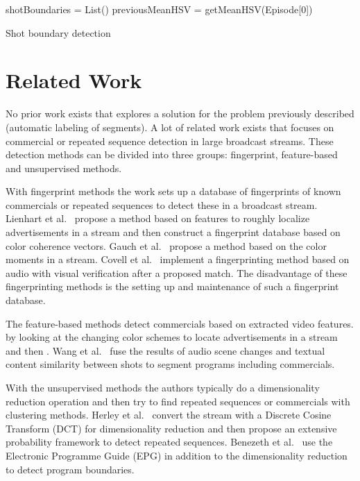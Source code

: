 \documentclass{article}
\begin{document}
\begin{algorithm}[h] \label{algorithm:shotboundary}
	\SetAlgoLined
	shotBoundaries = List()\;
	previousMeanHSV = getMeanHSV(Episode[0])\;
	\caption{Shot boundary detection}
\end{algorithm}

\section{Related Work} \label{relatedwork}

No prior work exists that explores a solution for the problem previously described (automatic labeling of segments).  A lot of related work exists that focuses on commercial or repeated sequence detection in large broadcast streams. These detection methods can be divided into three groups: fingerprint, feature-based and unsupervised methods. 

With fingerprint methods the work sets up a database of fingerprints of known commercials or repeated sequences to detect these in a broadcast stream. Lienhart et al.\ \cite{lienhart1997detection} propose a method based on features to roughly localize advertisements in a stream and then construct a fingerprint database based on color coherence vectors. Gauch et al.\ \cite{gauch2006finding} propose a method based on the color moments in a stream. Covell et al.\ \cite{covell2006advertisement} implement a fingerprinting method based on audio with visual verification after a proposed match. The disadvantage of these fingerprinting methods is the setting up and maintenance of such a fingerprint database. 


The feature-based methods detect commercials based on extracted video features.  by looking at the changing color schemes to locate advertisements in a stream and then . Wang et al.\ \cite{wang2008multimodal} fuse the results of audio scene changes and textual content similarity between shots to segment programs including commercials.

With the unsupervised methods the authors typically do a dimensionality reduction operation and then try to find repeated sequences or commercials with clustering methods. Herley et al.\ \cite{herley2006argos} convert the stream with a Discrete Cosine Transform (DCT) for dimensionality reduction and then propose an extensive probability framework to detect repeated sequences. Benezeth et al.\ \cite{benezeth2010unsupervised} use the Electronic Programme Guide (EPG) in addition to the dimensionality reduction to detect program boundaries.
\end{document}
